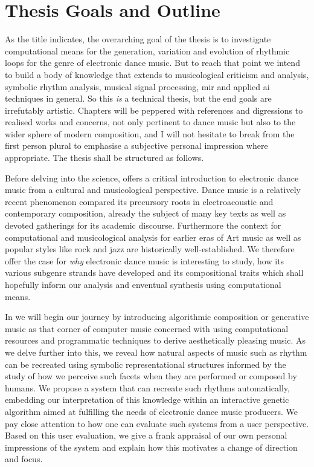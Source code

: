 \section{Thesis Goals and Outline}

As the title indicates, the overarching goal of the thesis is to investigate computational means for the generation, variation and evolution of rhythmic loops for the genre of electronic dance music. But to reach that point we intend to build a body of knowledge that extends to musicological criticism and analysis, symbolic rhythm analysis, musical signal processing, \acrshort{mir} and applied \acrshort{ai} techniques in general. So this \textit{is} a technical thesis, but the end goals are irrefutably artistic. Chapters will be peppered with references and digressions to realised works and concerns, not only pertinent to dance music but also to the wider sphere of modern composition, and I will not hesitate to break from the first person plural to emphasise a subjective personal impression where appropriate. The thesis shall be structured as follows.

Before delving into the science,  offers a critical introduction to electronic dance music from a cultural and musicological perspective. Dance music is a relatively recent phenomenon compared its precursory roots in electroacoustic and contemporary composition, already the subject of many key texts as well as devoted gatherings for its academic discourse. Furthermore the context for computational and musicological analysis for earlier eras of Art music as well as popular styles like rock and jazz are historically well-established. We therefore offer the case for \textit{why} electronic dance music is interesting to study, how its various subgenre strands have developed and its compositional traits which shall hopefully inform our analysis and enventual synthesis using computational means. 

In  we will begin our journey by introducing algorithmic composition or generative music as that corner of computer music concerned with using computational resources and programmatic techniques to derive aesthetically pleasing music. As we delve further into this, we reveal how natural aspects of music such as rhythm can be recreated using symbolic representational structures informed by the study of how we perceive such facets when they are performed or composed by humans. We propose a system that can recreate such rhythms automatically, embedding our interpretation of this knowledge within an interactive genetic algorithm aimed at fulfilling the needs of electronic dance music producers. We pay close attention to how one can evaluate such systems from a user perspective. Based on this user evaluation, we give a frank appraisal of our own personal impressions of the system and explain how this motivates a change of direction and focus.

